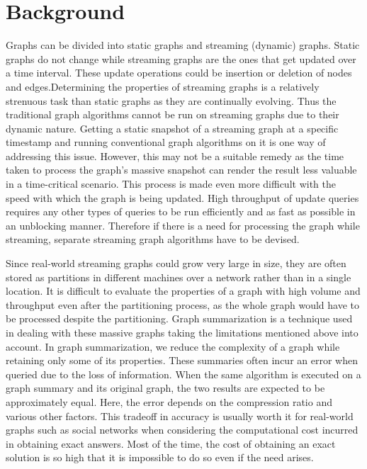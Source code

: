 \section{Background}

Graphs can be divided into static graphs and streaming (dynamic) graphs. Static graphs do not change while streaming graphs are the ones that get updated over a time interval. These update operations could be insertion or deletion of nodes and edges.Determining the properties of streaming graphs is a relatively strenuous task than static graphs as they are continually evolving. Thus the traditional graph algorithms cannot be run on streaming graphs due to their dynamic nature. Getting a static snapshot of a streaming graph at a specific timestamp and running conventional graph algorithms on it is one way of addressing this issue. However, this may not be a suitable remedy as the time taken to process the graph’s massive snapshot can render the result less valuable in a time-critical scenario. This process is made even more difficult with the speed with which the graph is being updated. High throughput of update queries requires any other types of queries to be run efficiently and as fast as possible in an unblocking manner. Therefore if there is a need for processing the graph while streaming, separate streaming graph algorithms have to be devised\cite{mcgregor_graph_2014}. 

Since real-world streaming graphs could grow very large in size, they are often stored as partitions in different machines over a network rather than in a single location. It is difficult to evaluate the properties of a graph with high volume and throughput even after the partitioning process, as the whole graph would have to be processed despite the partitioning. Graph summarization is a technique used in dealing with these massive graphs taking the limitations mentioned above into account. In graph summarization, we reduce the complexity of a graph while retaining only some of its properties. These summaries often incur an error when queried due to the loss of information. When the same algorithm is executed on a graph summary and its original graph, the two results are expected to be approximately equal. Here, the error depends on the compression ratio and various other factors. This tradeoff in accuracy is usually worth it for real-world graphs such as social networks when considering the computational cost incurred in obtaining exact answers. Most of the time, the cost of obtaining an exact solution is so high that it is impossible to do so even if the need arises. 

